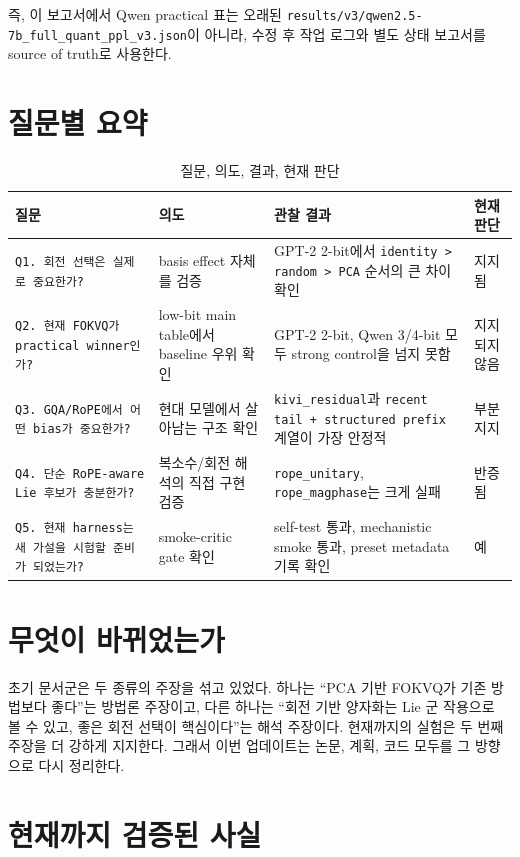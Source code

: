 \documentclass[11pt,a4paper]{article}
\begin{document}
즉, 이 보고서에서 Qwen practical 표는 오래된 \texttt{results/v3/qwen2.5-7b\_full\_quant\_ppl\_v3.json}이 아니라, 수정 후 작업 로그와 별도 상태 보고서를 source of truth로 사용한다.

\section{질문별 요약}

\begin{table}[H]
\centering
\caption{질문, 의도, 결과, 현재 판단}
\small
\begin{tabularx}{\textwidth}{@{}l X X l@{}}
\toprule
\textbf{질문} & \textbf{의도} & \textbf{관찰 결과} & \textbf{현재 판단} \\
\midrule
\texttt{Q1. 회전 선택은 실제로 중요한가?} & basis effect 자체를 검증 & GPT-2 2-bit에서 \texttt{identity > random > PCA} 순서의 큰 차이 확인 & 지지됨 \\
\texttt{Q2. 현재 FOKVQ가 practical winner인가?} & low-bit main table에서 baseline 우위 확인 & GPT-2 2-bit, Qwen 3/4-bit 모두 strong control을 넘지 못함 & 지지되지 않음 \\
\texttt{Q3. GQA/RoPE에서 어떤 bias가 중요한가?} & 현대 모델에서 살아남는 구조 확인 & \texttt{kivi\_residual}과 \texttt{recent tail + structured prefix} 계열이 가장 안정적 & 부분 지지 \\
\texttt{Q4. 단순 RoPE-aware Lie 후보가 충분한가?} & 복소수/회전 해석의 직접 구현 검증 & \texttt{rope\_unitary}, \texttt{rope\_magphase}는 크게 실패 & 반증됨 \\
\texttt{Q5. 현재 harness는 새 가설을 시험할 준비가 되었는가?} & smoke-critic gate 확인 & self-test 통과, mechanistic smoke 통과, preset metadata 기록 확인 & 예 \\
\bottomrule
\end{tabularx}
\end{table}

\section{무엇이 바뀌었는가}

초기 문서군은 두 종류의 주장을 섞고 있었다. 하나는 ``PCA 기반 FOKVQ가 기존 방법보다 좋다''는 방법론 주장이고, 다른 하나는 ``회전 기반 양자화는 Lie 군 작용으로 볼 수 있고, 좋은 회전 선택이 핵심이다''는 해석 주장이다. 현재까지의 실험은 두 번째 주장을 더 강하게 지지한다. 그래서 이번 업데이트는 논문, 계획, 코드 모두를 그 방향으로 다시 정리한다.

\section{현재까지 검증된 사실}
\end{document}
